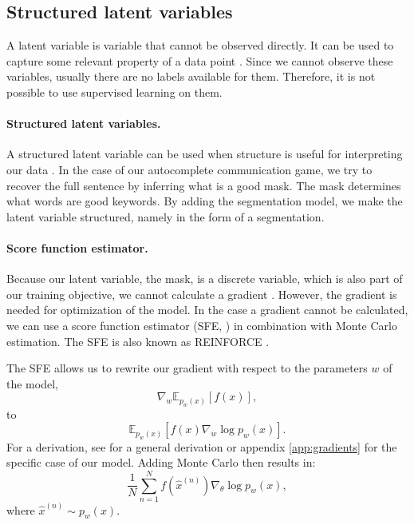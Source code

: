 \subsection{Structured latent variables}
A latent variable is variable that cannot be observed directly.
It can be used to capture some relevant property of a data point .
Since we cannot observe these variables, usually there are no labels available for them. 
Therefore, it is not possible to use supervised learning on them. 

\paragraph{Structured latent variables.}
A structured latent variable can be used when structure is useful for interpreting our data . 
In the case of our autocomplete communication game, we try to recover the full sentence by inferring what is a good mask.
The mask determines what words are good keywords.
By adding the segmentation model, we make the latent variable structured, namely in the form of a segmentation.


\paragraph{Score function estimator.}
Because our latent variable, the mask, is a discrete variable, which is also part of our training objective, we cannot calculate a gradient .
However, the gradient is needed for optimization of the model. 
In the case a gradient cannot be calculated, we can use a score function estimator (SFE, ) in combination with Monte Carlo estimation.
The SFE is also known as REINFORCE .

The SFE allows us to rewrite our gradient with respect to the parameters $w$ of the model,
\begin{equation}
    \nabla_w \mathbb{E}_{p_w(x)}[f(x)],
\end{equation}
to
\begin{equation}
    \mathbb{E}_{p_w(x)}[f(x)\nabla_w \log p_w(x)].
\end{equation}
For a derivation, see  for a general derivation or appendix \ref{app:gradients} for the specific case of our model. 
Adding Monte Carlo then results in:
\begin{equation}
    \label{eq:mc}
    \frac{1}{N} \sum_{n=1}^N f(\hat{x}^{(n)}) \nabla_{\theta} \log p_w(x),
\end{equation}
where $\hat{x}^{(n)} \sim p_w(x)$.

